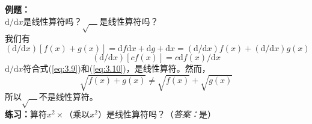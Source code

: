 	\begin{examplebox}
		\textbf{例题：}\\
		$\mathrm{d}/\mathrm{d}x$是线性算符吗？$\sqrt{\quad}$是线性算符吗？\\
		
		我们有
		\begin{equation*}
			\left(\mathrm{d}/\mathrm{d}x\right) \left[f\left(x\right)+g\left(x\right)\right] = \mathrm{d}f\mathrm{d}x+\mathrm{d}g+\mathrm{d}x=\left(\mathrm{d}/\mathrm{d}x\right)f\left(x\right)+\left(\mathrm{d}/\mathrm{d}x\right)g\left(x\right)
		\end{equation*}
		\begin{equation*}
			\left(\mathrm{d}/\mathrm{d}x\right)\left[cf\left(x\right)\right] = c \mathrm{d}f\left(x\right) /\mathrm{d}x
		\end{equation*}
		$\mathrm{d}/\mathrm{d}x$符合式(\ref{eq:3.9})和(\ref{eq:3.10})，是线性算符。然而，
		\begin{equation*}
			\sqrt{f\left(x\right)+g\left(x\right)} \neq \sqrt{f\left(x\right)} +\sqrt{g\left(x\right)}
		\end{equation*}
		所以$\sqrt{\quad}$不是线性算符。\\
		
		\textbf{练习：}算符$x^2\times$（乘以$x^2$）是线性算符吗？（\textit{答案：}是）
	\end{examplebox}

